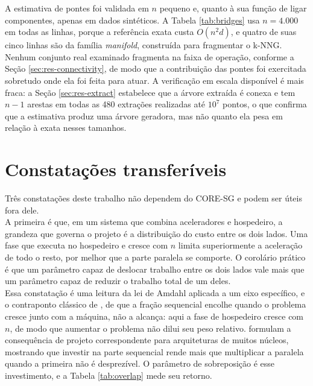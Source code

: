 A estimativa de pontes foi validada em $n$ pequeno e, quanto à sua função de ligar componentes, apenas em dados sintéticos. A Tabela \ref{tab:bridges} usa $n = 4.000$ em todas as linhas, porque a referência exata custa $O(n^2 d)$, e quatro de suas cinco linhas são da família \textit{manifold}, construída para fragmentar o \ac{k-NNG}. Nenhum conjunto real examinado fragmenta na faixa de operação, conforme a Seção \ref{sec:res-connectivity}, de modo que a contribuição das pontes foi exercitada sobretudo onde ela foi feita para atuar. A verificação em escala disponível é mais fraca: a Seção \ref{sec:res-extract} estabelece que a árvore extraída é conexa e tem $n-1$ arestas em todas as 480 extrações realizadas até $10^7$ pontos, o que confirma que a estimativa produz uma árvore geradora, mas não quanto ela pesa em relação à exata nesses tamanhos.\\

\section{Constatações transferíveis\label{sec:disc-insights}}

Três constatações deste trabalho não dependem do \ac{CORE-SG} e podem ser úteis fora dele.\\

A primeira é que, em um sistema que combina aceleradores e hospedeiro, a grandeza que governa o projeto é a distribuição do custo entre os dois lados. Uma fase que executa no hospedeiro e cresce com $n$ limita superiormente a aceleração de todo o resto, por melhor que a parte paralela se comporte. O corolário prático é que um parâmetro capaz de deslocar trabalho entre os dois lados vale mais que um parâmetro capaz de reduzir o trabalho total de um deles.\\

Essa constatação é uma leitura da lei de Amdahl \cite{amdahl} aplicada a um eixo específico, e o contraponto clássico de , de que a fração sequencial encolhe quando o problema cresce junto com a máquina, não a alcança: aqui a fase de hospedeiro cresce com $n$, de modo que aumentar o problema não dilui seu peso relativo.  formulam a consequência de projeto correspondente para arquiteturas de muitos núcleos, mostrando que investir na parte sequencial rende mais que multiplicar a paralela quando a primeira não é desprezível. O parâmetro de sobreposição é esse investimento, e a Tabela \ref{tab:overlap} mede seu retorno.\\

